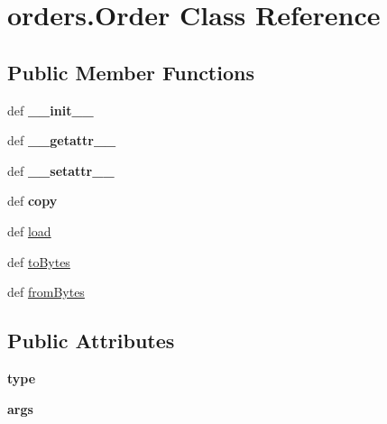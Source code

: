 \hypertarget{classorders_1_1_order}{\section{orders.\-Order \-Class \-Reference}
\label{classorders_1_1_order}
}
\subsection*{\-Public \-Member \-Functions}
\begin{DoxyCompactItemize}
\item 
\hypertarget{classorders_1_1_order_a9edb54cb84082a08a74e530fd1e76b1b}{def {\bfseries \-\_\-\-\_\-init\-\_\-\-\_\-}}\label{classorders_1_1_order_a9edb54cb84082a08a74e530fd1e76b1b}

\item 
\hypertarget{classorders_1_1_order_a59845607c6c2fa3acd7de4a2ce77dcc9}{def {\bfseries \-\_\-\-\_\-getattr\-\_\-\-\_\-}}\label{classorders_1_1_order_a59845607c6c2fa3acd7de4a2ce77dcc9}

\item 
\hypertarget{classorders_1_1_order_a2e56120bbdf2113577a02c4363c62962}{def {\bfseries \-\_\-\-\_\-setattr\-\_\-\-\_\-}}\label{classorders_1_1_order_a2e56120bbdf2113577a02c4363c62962}

\item 
\hypertarget{classorders_1_1_order_a078dacfd495f75c137de77d841befb70}{def {\bfseries copy}}\label{classorders_1_1_order_a078dacfd495f75c137de77d841befb70}

\item 
def \hyperlink{classorders_1_1_order_a780c0dbab2da2360364f90ab01eb844f}{load}
\item 
def \hyperlink{classorders_1_1_order_ac2672b32c4cbe4666d7d1cdf71cd54b7}{to\-Bytes}
\item 
def \hyperlink{classorders_1_1_order_a66e727b5ba70f44495cd2a15e079c9eb}{from\-Bytes}
\end{DoxyCompactItemize}
\subsection*{\-Public \-Attributes}
\begin{DoxyCompactItemize}
\item 
\hypertarget{classorders_1_1_order_afb4003458342b2aeebb67c8bc89afefa}{{\bfseries type}}\label{classorders_1_1_order_afb4003458342b2aeebb67c8bc89afefa}

\item 
\hypertarget{classorders_1_1_order_a04e5f09b80a685f731d291e0de2a61db}{{\bfseries args}}\label{classorders_1_1_order_a04e5f09b80a685f731d291e0de2a61db}

\end{DoxyCompactItemize}
